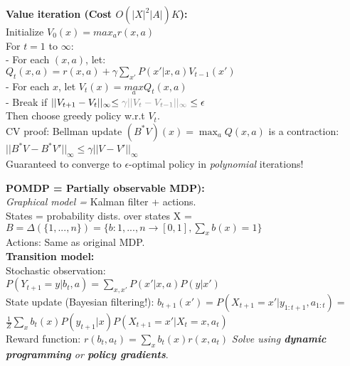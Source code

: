 \textbf{Value iteration (Cost $O(|X|^2|A|)K$):}\\
Initialize $V_0(x)=max_a r(x,a)$\\
For $t=1$ to $\infty$:\\
- For each $(x,a)$, let: \\
$Q_t(x,a)=r(x,a)+\gamma\sum_{x'}P(x'|x,a)V_{t-1}(x')$\\
- For each $x$, let $V_t(x)=\underset{a}{max}Q_t(x,a)$\\
- Break if $||V_{t+1}-V_{t}||_{\infty}{\leq\color{gray}\gamma||V_t-V_{t-1}||_{\infty}}\leq\epsilon$\\
Then choose greedy policy w.r.t $V_t$.\\
CV proof: Bellman update $(B^*V)(x) = \max_a Q(x,a)$ is a contraction: $||B^*V-B^*V'||_\infty \leq \gamma||V-V'||_\infty$\\
Guaranteed to converge to $\epsilon$-optimal policy in \emph{polynomial} iterations!

\textbf{POMDP = Partially observable MDP):}\\
\emph{Graphical model =} Kalman filter + actions.\\
States = probability dists. over states X =\\
\mbox{$B=\Delta(\{1,...,n\})=\{ b:{1,...,n} \rightarrow [0,1],\sum_x b(x)=1 \}$}\\
Actions: Same as original MDP.\\
\textbf{Transition model:}\\
Stochastic observation:\\
$P(Y_{t+1}=y|b_t,a)=\sum_{x,x'} P(x'|x,a)P(y|x')$\\
State update (Bayesian filtering!):
$b_{t+1}(x') = P(X_{t+1}=x'|y_{1:t+1},a_{1:t})=$\\$\frac{1}{Z}\sum_xb_t(x)P(y_{t+1}|x)P(X_{t+1}=x'|X_t=x,a_t)$\\
Reward function: $r(b_t, a_t)=\sum_x b_t(x)r(x,a_t)$
\emph{Solve using \textbf{dynamic programming} or \textbf{policy gradients}}.

